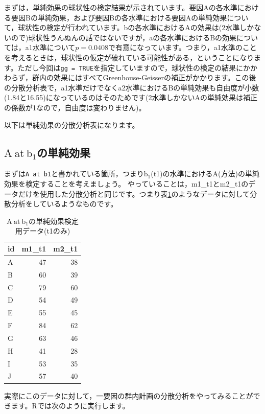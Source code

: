 \documentclass{ltjbook}
\begin{document}
まずは，単純効果の球状性の検定結果が示されています。要因Aの各水準における要因Bの単純効果，および要因Bの各水準における要因Aの単純効果について，球状性の検定が行われています。bの各水準におけるAの効果は(2水準しかないので)球状性うんぬんの話ではないですが，aの各水準におけるBの効果については，a1水準について$p=0.0408$で有意になっています。つまり，a1水準のことを考えるときは，球状性の仮定が破れている可能性がある，ということになります。ただし今回は\verb|gg = TRUE|を指定していますので，球状性の検定の結果にかかわらず，群内の効果にはすべてGreenhouse-Geisserの補正がかかります。この後の分散分析表で，a1水準だけでなくa2水準におけるBの単純効果も自由度が小数(1.84と16.55)になっているのはそのためです(2水準しかないAの単純効果は補正の係数が1なので，自由度は変わりません)。

以下は単純効果の分散分析表になります。
\subsection{$\mathrm{A}\ \mathrm{at}\ \mathrm{b}_1$の単純効果}

まずは\verb|A at b1|と書かれている箇所，つまり$\mathrm{b}_1$(t1)の水準における$\mathrm{A}$(方法)の単純効果を検定することを考えましょう。
やっていることは，m1\_t1とm2\_t1のデータだけを使用した分散分析と同じです。つまり表\ref{tbl:22_02}のようなデータに対して分散分析をしているようなものです。

\begin{table}[ht]
\centering
	\caption{$\mathrm{A}\ \mathrm{at}\ \mathrm{b}_1$の単純効果検定用データ(t1のみ)}
	\label{tbl:22_02}
\begin{tabular}{lrr}
  \hline
id & m1\_t1 & m2\_t1 \\
  \hline
A & 47 & 38 \\
B & 60 & 39 \\
C & 79 & 60 \\
D & 54 & 49 \\
E & 55 & 45 \\
F & 84 & 62 \\
G & 63 & 46 \\
H & 41 & 28 \\
I & 53 & 35 \\
J & 57 & 40 \\
  \hline
\end{tabular}
\end{table}

実際にこのデータに対して，一要因の群内計画の分散分析をやってみることができます。Rでは次のように実行します。
\end{document}
